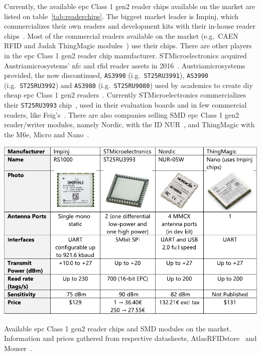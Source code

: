 Currently, the available \ac{epc} Class 1 \ac{gen2} reader chips available on the market are listed on table~\ref{tab:readerchips}.
The biggest market leader is Impinj, which commercializes their own readers and development kits with their in-house reader chips~\cite{RAINRFIDReader}. Most of the commercial readers available on the market (e.g.\ CAEN RFID and Jadak ThingMagic modules~\cite{RAINRFIDPartner}) use their chips.
There are other players in the \ac{epc} Class 1 \ac{gen2} reader chip manufacturer. 
STMicroelectronics acquired Austriamicrosystems' \ac{nfc} and \ac{rfid} reader assets in 2016~\cite{PressRelease}. Austriamicrosystems provided, the now discontinued, \texttt{AS3990} (i.g.\ \texttt{ST25RU3991}), \texttt{AS3990} (i.g.\ \texttt{ST25RU3992}) and \texttt{AS3980} (i.g.\ \texttt{ST25RU9080}) used by academics to create \acs{diy} cheap \ac{epc} Class 1 \ac{gen2} readers~\cite{tangDesignUHFRFID2010a, leiDesignHandheldUHF2011, liDesignRadioFrequency2011}. Currently STMicroelectronics
commercializes their \texttt{ST25RU3993} chip~\cite{ST25RU3993}, used in their evaluation boards and in few commercial readers, like Feig's~\cite{UHFMidRange}.
There are also companies selling SMD \ac{epc} Class 1 \ac{gen2} reader/writer modules, namely Nordic, with the ID NUR~\cite{NURModulesNordic}, and ThingMagic with the M6e, Micro and Nano~\cite{ThingMagicRFID}.

\begin{table}
    \centering
    \includegraphics[width=\linewidth]{./figs/02-state-of-the-art/table_chipreaders.pdf}
    \caption[Available \ac{epc} Class 1 \ac{gen2} reader chips and SMD modules on the market]{Available \ac{epc} Class 1 \ac{gen2} reader chips and SMD modules on the market. Information and prices gathered from respective datasheets, AtlasRFIDstore~\cite{AtlasRFIDstoreBuyRFID} and Mouser~\cite{DistribuidorComponentesEletronicos}.}
    \label{tab:readerchips}
\end{table}

